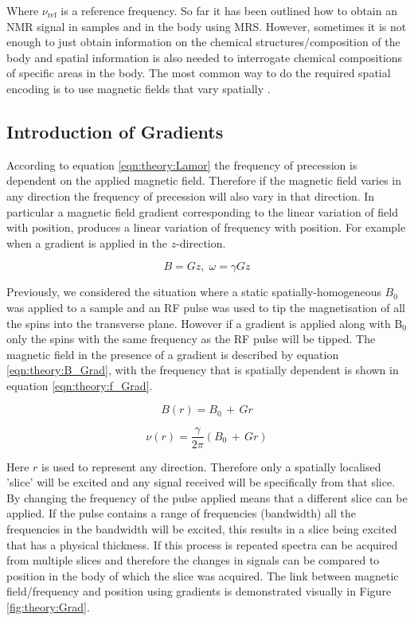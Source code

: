 Where $\nu_{\textrm{ref}}$ is a reference frequency. So far it has been outlined how to obtain an \ac{NMR} signal in samples and in the body using MRS. However, sometimes it is not enough to just obtain information on the chemical structures/composition of the body and spatial information is also needed to interrogate chemical compositions of specific areas in the body. The most common way to do the required spatial encoding is to use magnetic fields that vary spatially \cite{Haacke2014MagneticDesign}. 

\subsection{Introduction of Gradients}

According to equation \ref{eqn:theory:Lamor} the frequency of precession is dependent on the applied magnetic field. Therefore if the magnetic field varies in any direction the frequency of precession will also vary in that direction. In particular a magnetic field gradient corresponding to the linear variation of field with position, produces a linear variation of frequency with position. For example when a gradient is applied in the $z$-direction.

\begin{equation}
    B = Gz,\; \omega = \gamma Gz 
\end{equation}

Previously, we considered the situation where a static spatially-homogeneous $B_0$ was applied to a sample and an \ac{RF} pulse was used to tip the magnetisation of all the spins into the transverse plane. However if a gradient is applied along with B$_0$ only the spins with the same frequency as the \ac{RF} pulse will be tipped. The magnetic field in the presence of a gradient is described by equation \ref{eqn:theory:B_Grad}, with the frequency that is spatially dependent is shown in equation \ref{eqn:theory:f_Grad}.

\begin{equation}
    B(r) = B_0 \, + \, Gr
    \label{eqn:theory:B_Grad}
\end{equation}

\begin{equation}
    \nu(r) = \frac{\gamma}{2\pi}(B_0 \, + \, Gr)
    \label{eqn:theory:f_Grad}
\end{equation}

\noindent Here $r$ is used to represent any direction. Therefore only a spatially localised 'slice' will be excited and any signal received will be specifically from that slice. By changing the frequency of the pulse applied means that a different slice can be applied. If the pulse contains a range of frequencies (bandwidth) all the frequencies in the bandwidth will be excited, this results in a slice being excited that has a physical thickness. If this process is repeated spectra can be acquired from multiple slices and therefore the changes in signals can be compared to position in the body of which the slice was acquired. The link between magnetic field/frequency and position using gradients is demonstrated visually in Figure \ref{fig:theory:Grad}.

